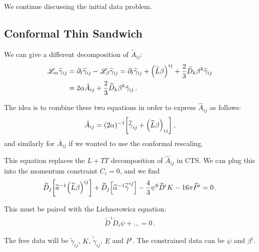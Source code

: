 \documentclass[main.tex]{subfiles}
\begin{document}

We continue discussing the initial data problem. 

\subsection{Conformal Thin Sandwich}

We can give a different decomposition of \(\widetilde{A}_{ij}\): 
%
\begin{align}
\mathscr{L}_m \widetilde{\gamma}_{ij} &= \partial_{t} \widetilde{\gamma}_{ij} - \mathscr{L}_\beta \widetilde{\gamma}_{ij} = \partial_{t} \widetilde{\gamma}_{ij} + \qty( \widetilde{L} \beta )^{ij} + \frac{2}{3} \widetilde{D}_{k} \beta^{k} \widetilde{\gamma}_{ij}  \\
&= 2 \alpha \hat{A}_{ij} + \frac{2}{3} \widetilde{D}_{k} \beta^{k} \hat{\gamma}_{ij}
\,.
\end{align}

The idea is to combine these two equations in order to express \(\hat{A}_{ij}\) as follows: 
%
\begin{align}
\hat{A}_{ij} = (2\alpha )^{-1} \qty[ \widetilde{\dot{\gamma}}_{ij} + \qty(\widetilde{L} \beta )_{ij}]
\,,
\end{align}
%
and similarly for \(\overline{A}_{ij}\) if we wanted to use the conformal rescaling.

This equation replaces the \(L + TT\) decomposition of \(\hat{A}_{ij}\) in CTS. 
We can plug this into the momentum constraint \(C_i = 0\), and we find 
%
\begin{align}
\widetilde{D}_{j} \qty[ \widetilde{a}^{-1} \qty(\widetilde{L} \beta )^{ij}] + \widetilde{D}_{j} \qty[\widetilde{\alpha}^{-1} \widetilde{\dot{\gamma}}^{ij}] 
- \frac{4}{3} \psi^{6} \widetilde{D}^{i} K 
- 16 \pi \widetilde{P}^{i} = 0
\,.
\end{align}

This must be paired with the Lichnerowicz equation: 
%
\begin{align}
\widetilde{D}^{i} \widetilde{D}_{i} \psi + \dots = 0
\,.
\end{align}

The free data will be \(\widetilde{\gamma}_{ij}\), \(K\), \(\widetilde{\dot{\gamma}}_{ij}\), \(E\) and \(P^{i}\). 
The constrained data can be \(\psi \) and \(\beta^{i}\). 
\end{document}
